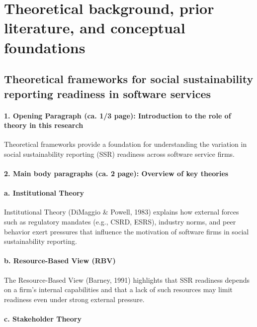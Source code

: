 \chapter{Theoretical background, prior literature, and conceptual foundations}

\section{Theoretical frameworks for social sustainability reporting readiness in software services}

\subsubsection{1. Opening Paragraph (ca. 1/3 page): Introduction to the role of theory in this research}

Theoretical frameworks provide a foundation for understanding the variation 
in social sustainability reporting (SSR) readiness across software service firms.

\subsubsection{2. Main body paragraphs (ca. 2 page): Overview of key theories}

\vspace{8pt}
    \subsubsection{a. Institutional Theory}

Institutional Theory (DiMaggio \& Powell, 1983) explains how external forces such as regulatory mandates (e.g., CSRD, ESRS),
industry norms, and peer behavior exert pressures that influence the motivation of software firms in 
social sustainability reporting.

    \subsubsection{b. Resource-Based View (RBV)}

The Resource-Based View (Barney, 1991) highlights that SSR readiness depends on a firm's internal capabilities 
and that a lack of such resources may limit readiness even under strong external pressure.

    \subsubsection{c. Stakeholder Theory}


